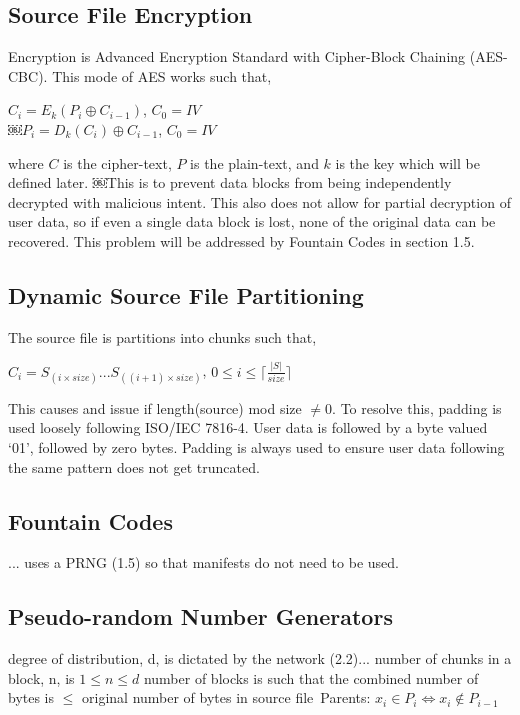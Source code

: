 \documentclass[journal]{IEEEtran}
\begin{document}
\subsection{Source File Encryption}
Encryption is Advanced Encryption Standard with Cipher-Block Chaining (AES-CBC). This mode of AES works such that,

\begin{center}
$C_i = E_k(P_i \oplus{} C_{i-1})$, $C_0 = IV$\\
$￼P_i = D_k(C_i) \oplus{} C_{i-1}$, $C_0 = IV$\\
\end{center}

where $C$ is the cipher-text, $P$ is the plain-text, and $k$ is the key which will be defined later. ￼This is to prevent data blocks from being independently decrypted with malicious intent. This also does not allow for partial decryption of user data, so if even a single data block is lost, none of the original data can be recovered. This problem will be addressed by Fountain Codes in section 1.5.

\subsection{Dynamic Source File Partitioning}
The source file is partitions into chunks such that,

\begin{center}
$C_i = S_{(i \times{} size)} ... S_{((i + 1) \times{} size)}$, $0 \le i \le \lceil{\frac{\left\vert{S}\right\vert}{size}}\rceil$ \\
\end{center}

This causes and issue if length(source) mod size $\neq 0$. To resolve this, padding is used loosely following ISO/IEC 7816-4. User data is followed by a byte valued ‘01’, followed by zero bytes. Padding is always used to ensure user data following the same pattern does not get truncated.

\subsection{Fountain Codes}
... uses a PRNG (1.5) so that manifests do not need to be used.

\subsection{Pseudo-random Number Generators}
degree of distribution, d, is dictated by the network (2.2)... number of chunks in a block, n, is $1 \le n \le d$
number of blocks is such that the combined number of bytes is $\le$ original number of bytes in source file\
Parents: $x_i \in P_i \iff x_i \notin P_{i-1}$
\end{document}
